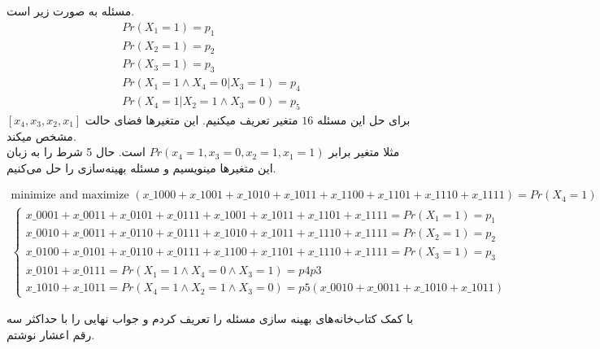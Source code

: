 \section{}

مسئله به صورت زیر است. 
\begin{gather*}
	Pr(X_{1} = 1) = p_{1} \\
	Pr(X_{2} = 1) = p_{2} \\
	Pr(X_{3} = 1) = p_{3} \\
	Pr(X_{1} = 1 \land X_{4} = 0|X_{3} = 1) = p_{4} \\
	Pr(X_{4} = 1|X_{2} = 1 \land X_{3} = 0) = p_{5}
\end{gather*}
برای حل این مسئله $ 16 $ متغیر تعریف میکنیم. این متغیرها فضای حالت 
$ [x_{4},x_{3},x_{2},x_{1}] $
مشخص میکند. 
\\
مثلا متغیر 
برابر 
$ Pr(x_{4} = 1,x_{3} = 0,x_{2} = 1,x_{1} = 1) $
است. حال 5 شرط را به زبان این متغیر‌ها مینویسیم و مسئله بهینه‌سازی را حل می‌کنیم. 
\begin{latin}
	\begin{gather*}
		\text{minimize and maximize } (x\_1000 + x\_1001 + x\_1010 + x\_1011 + x\_1100 + x\_1101 + x\_1110 + x\_1111) = Pr(X_{4} = 1)
		\\
		\begin{cases}
			x\_0001 + x\_0011 + x\_0101 + x\_0111 + x\_1001 + x\_1011 + x\_1101 + x\_1111 = Pr(X_{1} = 1) = p_{1}
			\\
			x\_0010 + x\_0011 + x\_0110 + x\_0111 + x\_1010 + x\_1011 + x\_1110 + x\_1111 = Pr(X_{2} = 1) = p_{2}
			\\
			x\_0100 + x\_0101 + x\_0110 + x\_0111 + x\_1100 + x\_1101 + x\_1110 + x\_1111 = Pr(X_{3} = 1) = p_{3}
			\\
			x\_0101 + x\_0111 = Pr(X_{1} = 1 \land X_{4} = 0 \land X_{3} = 1) = p4 p3
			\\
			x\_1010 + x\_1011 = Pr(X_{4} = 1 \land X_{2} = 1 \land X_{3} = 0) = p5 (x\_0010 + x\_0011 + x\_1010 + x\_1011)
	\end{cases}
	\end{gather*}
\end{latin}
با کمک کتاب‌خانه‌های بهینه سازی مسئله را تعریف کردم و جواب نهایی را با حداکثر سه رقم اعشار نوشتم.


